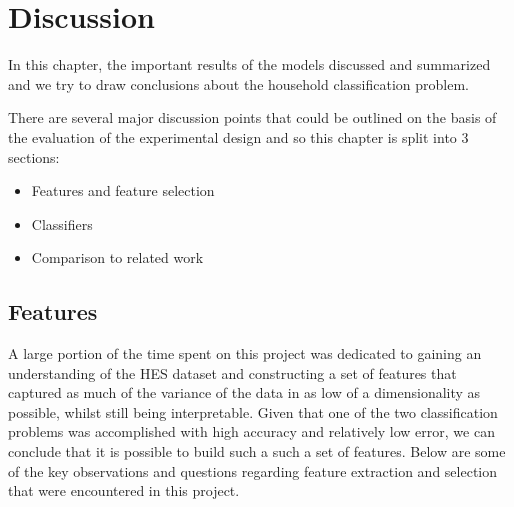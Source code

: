 \chapter{Discussion}

In this chapter, the important results of the models discussed and summarized and we try to draw conclusions about the household classification problem.

There are several major discussion points that could be outlined on the basis of the evaluation of the experimental design and so this chapter is split into 3 sections:

\begin{itemize}
\item Features and feature selection
\item Classifiers
\item Comparison to related work
\end{itemize}



\section{Features}

A large portion of the time spent on this project was dedicated to gaining an understanding of the HES dataset and constructing a set of features that captured as much of the variance of the data in as low of a dimensionality as possible, whilst still being interpretable. Given that one of the two classification problems was accomplished with high accuracy and relatively low error, we can conclude that it is possible to build such a such a set of features. Below are some of the key observations and questions regarding feature extraction and selection that were encountered in this project.

